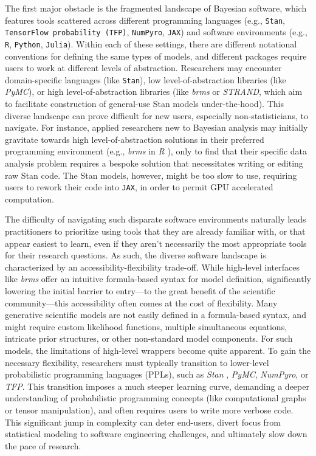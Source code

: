 \documentclass[num-refs]{wiley-article}
\begin{document}
The first major obstacle is the fragmented landscape of Bayesian software, which features tools scattered across different programming languages (e.g., \texttt{Stan}, \texttt{TensorFlow probability (TFP)}, \texttt{NumPyro}, \texttt{JAX}) and software environments (e.g., \texttt{R}, \texttt{Python}, \texttt{Julia}). Within each of these settings, there are different notational conventions for defining the same types of models, and different packages require users to work at different levels of abstraction. Researchers may encounter domain-specific languages (like \texttt{Stan}), low level-of-abstraction libraries (like \textit{PyMC}), or high level-of-abstraction libraries (like \textit{brms} or \textit{STRAND}, which aim to facilitate construction of general-use Stan models under-the-hood). This diverse landscape can prove difficult for new users, especially non-statisticians, to navigate. For instance, applied researchers new to Bayesian analysis may initially gravitate towards high level-of-abstraction solutions in their preferred programming environment (e.g., \textit{brms} \citep{BRMS} in \textit{R} \citep{R}), only to find that their specific data analysis problem requires a bespoke solution that necessitates writing or editing raw Stan code. The Stan models, however, might be too slow to use, requiring users to rework their code into \texttt{JAX}, in order to permit GPU accelerated computation.

The difficulty of navigating such disparate software environments naturally leads practitioners to prioritize using tools that they are already familiar with, or that appear easiest to learn, even if they aren't necessarily the most appropriate tools for their research questions. As such, the diverse software landscape is characterized by an accessibility-flexibility trade-off. While high-level interfaces like \textit{brms} offer an intuitive formula-based syntax for model definition, significantly lowering the initial barrier to entry---to the great benefit of the scientific community---this accessibility often comes at the cost of flexibility. Many generative scientific models are not easily defined in a formula-based syntax, and might require custom likelihood functions, multiple simultaneous equations, intricate prior structures, or other non-standard model components. For such models, the limitations of high-level wrappers become quite apparent. To gain the necessary flexibility, researchers must typically transition to lower-level probabilistic programming languages (PPLs), such as \textit{Stan} \citep{Stan}, \textit{PyMC}, \textit{NumPyro}, or \textit{TFP}. This transition imposes a much steeper learning curve, demanding a deeper understanding of probabilistic programming concepts (like computational graphs or tensor manipulation), and often requires users to write more verbose code. This significant jump in complexity can deter end-users, divert focus from statistical modeling to software engineering challenges, and ultimately slow down the pace of research.
\end{document}
